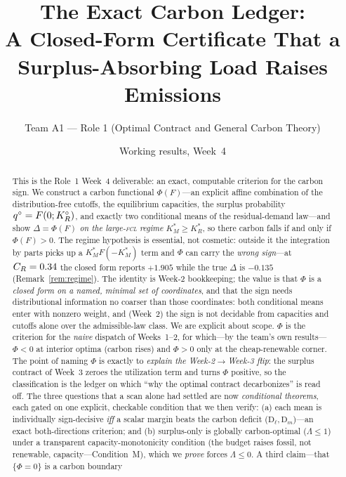 \documentclass[11pt,reqno]{amsart}
\theoremstyle{plain}
\theoremstyle{definition}
\theoremstyle{remark}
\theoremstyle{remark}\newtheorem{observation}{Observation}
\newcommand{\KRs}{K_R^{*}}\newcommand{\KFs}{K_F^{*}}\newcommand{\KMs}{K_M^{*}}
\newcommand{\KRo}{K_R^{\circ}}\newcommand{\KFo}{K_F^{\circ}}
\begin{document}
\title[The Carbon Ledger and the Backfire Certificate (Week 4)]
{The Exact Carbon Ledger:\\
A Closed-Form Certificate That a Surplus-Absorbing Load Raises Emissions}
\author{Team A1 --- Role 1 (Optimal Contract and General Carbon Theory)}
\date{Working results, Week~4}

\begin{abstract}
This is the Role~1 Week~4 deliverable: an exact, computable criterion for the carbon
sign. We construct a carbon functional $\Phi(F)$---an explicit affine combination of the
distribution-free cutoffs, the equilibrium capacities, the surplus probability
$\qo=F(0;\KRo)$, and exactly two conditional means of the residual-demand law---and show
$\Delta=\Phi(F)$ \emph{on the large-\textsc{fcl} regime} $\KMs\ge\KRs$, so there carbon
falls if and only if $\Phi(F)>0$. The regime hypothesis is essential, not cosmetic:
outside it the integration by parts picks up a $\KMs F(-\KMs)$ term and $\Phi$ can carry
the \emph{wrong sign}---at $C_R=0.34$ the closed form reports $+1.905$ while the true
$\Delta$ is $-0.135$ (Remark~\ref{rem:regime}).
The identity is Week-2 bookkeeping; the value is that $\Phi$ is a
\emph{closed form on a named, minimal set of coordinates}, and that the sign needs
distributional information no coarser than those coordinates: both conditional means enter
with nonzero weight, and (Week~2) the sign is not decidable from capacities and cutoffs
alone over the admissible-law class. We are explicit about scope. $\Phi$ is the criterion
for the \emph{naive} dispatch of Weeks~1--2, for which---by the team's own results---%
$\Phi<0$ at interior optima (carbon rises) and $\Phi>0$ only at the cheap-renewable
corner. The point of naming $\Phi$ is exactly to \emph{explain the Week-2$\to$Week-3
flip}: the surplus contract of Week~3 zeroes the utilization term and turns $\Phi$
positive, so the classification is the ledger on which ``why the optimal contract
decarbonizes'' is read off. The three questions that a scan alone had settled are now \emph{conditional theorems}, each
gated on one explicit, checkable condition that we then verify: (a) each mean is
individually sign-decisive \emph{iff} a scalar margin beats the carbon deficit
($\mathrm{D}_\ell,\mathrm{D}_m$)---an exact both-directions criterion; and (b) surplus-only
is globally carbon-optimal ($\Lambda\le1$) under a transparent capacity-monotonicity
condition (the budget raises fossil, not renewable, capacity---Condition~M), which we
\emph{prove} forces $\Lambda\le0$. A third claim---that $\{\Phi=0\}$ is a carbon boundary

\end{abstract}
\end{document}

